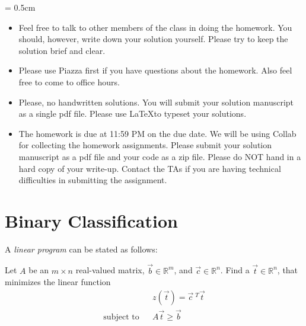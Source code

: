 
\usepackage{graphicx}
\usepackage{subfigure}
\usepackage{amsmath}
\usepackage{amssymb}
\usepackage{epsfig}
\usepackage{enumerate}
\usepackage{color}
\usepackage{algorithmic}
\usepackage{hyperref}
\usepackage{color}


\sloppy
\parskip = 0.5cm

\newcommand{\ignore}[1]{}
\newcommand{\pp}{\noindent}
\newcommand{\ov}{\overline}
\newcommand{\bb}[1]{{\bf #1}}
\renewcommand{\labelitemii}{\tiny$\circ$}

\newcommand{\question}[1]{#1}%
%
\newcommand{\answer}[2]{{
\vspace{10pt} 
\color{red}{#2}
\vspace{10pt}
}
}
\newcommand{\comment}[1]{}


\oddsidemargin 0in
\evensidemargin 0in
\textwidth 6.5in
\topmargin -0.5in
\textheight 9.0in


\setlength{\unitlength}{1mm}

\thispagestyle{plain}
\newpage
{}

\begin{itemize}
\item Feel free to talk to other members of the class in doing the homework. You should, however,
write down your solution yourself.  Please try to keep the solution brief and clear.

\item Please use Piazza first if you have questions about the homework. Also feel free to come to office hours.

\item Please, no handwritten solutions. You will submit your solution manuscript as a single pdf file. Please use \LaTeX to typeset your solutions.

\item The homework is due at 11:59 PM on the due date. We will be using
Collab for collecting the homework assignments. Please submit your solution manuscript as a pdf file and your code as a zip file.  Please do NOT hand in a hard copy of your write-up.
Contact the TAs if you are having technical difficulties in 
submitting the assignment. 
\end{itemize}



\section{Binary Classification} 
A {\em linear program} can be stated as follows:
\begin{definition}
Let 
$A$ be an $m \times n$ real-valued matrix,
$\vec{b} \in \mathbb{R}^m$, and $\vec{c} \in \mathbb{R}^n$.
Find a $\vec{t} \in \mathbb{R}^n$, that minimizes the linear function
\begin{eqnarray*}
  & & z(\vec{t}) = \vec{c}~^T \vec{t} \\
\textrm{subject to} & & A \vec{t} \geq \vec{b}
\end{eqnarray*}
\end{definition}

